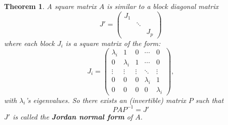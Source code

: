 \documentclass[a4paper,11pt]{report}
\newtheorem{theorem}{Theorem}[section]
\begin{document}
\begin{theorem}\label{jordanvrom}
  A square matrix $A$ is similar to a block diagonal matrix 
  $$ J' = \begin{pmatrix}
  J_1 & & \\
  & \ddots & \\
  & & J_p
  \end{pmatrix}$$
  where each block $J_i$ is a square matrix of the form:
  $$J_i = \begin{pmatrix}
\lambda_i & 1       & 0       & \cdots  & 0 \\
0       & \lambda_i & 1       & \cdots  & 0 \\
\vdots  & \vdots  & \vdots& \ddots  & \vdots \\
0       & 0       & 0        & \lambda_i & 1       \\
0       & 0       & 0       & 0       & \lambda_i
  \end{pmatrix},$$
 with $\lambda_i$'s eigenvalues. So there exists an (invertible) matrix $P$ such that 
  $$PAP^{-1} = J'$$
  $J'$ is called the \textbf{Jordan normal form}  of $A$.
  \end{theorem}
\end{document}

